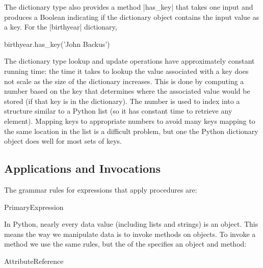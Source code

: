 The dictionary type also provides a method \pycode|has_key| that takes one input and produces a Boolean indicating if the dictionary object contains the input value as a key.  For the \pycode|birthyear| dictionary, 

\begin{pythoninteractsm}{birthyear.has_key('John Backus')}
\end{pythoninteractsm}

The dictionary type lookup and update operations have approximately constant running time: the time it takes to lookup the value associated with a key does not scale as the size of the dictionary increases.  This is done by computing a number based on the key that determines where the associated value would be stored (if that key is in the dictionary).  The number is used to index into a structure similar to a Python list (so it has constant time to retrieve any element).  Mapping keys to appropriate numbers to avoid many keys mapping to the same location in the list is a difficult problem, but one the Python dictionary object does well for most sets of keys.

\subsection{Applications and Invocations}

The grammar rules for expressions that apply procedures are:

\begin{bnfgrammarm}{PrimaryExpression}
\end{bnfgrammarm}

In Python, nearly every data value (including lists and strings) is an object.  This means the way we manipulate data is to invoke methods on objects.  To invoke a method we use the same rules, but the  of the  specifies an object and method:
\begin{bnfgrammarm}{AttributeReference}
\end{bnfgrammarm}

